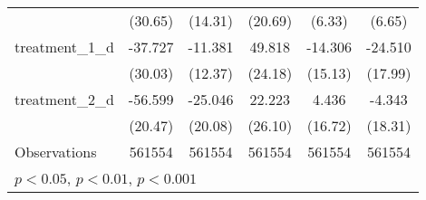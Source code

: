 {\begin{tabular}{l*{5}{c}}
                    &     (30.65)         &     (14.31)         &     (20.69)         &      (6.33)         &      (6.65)         \\
treatment\_1\_d       &     -37.727         &     -11.381         &      49.818         &     -14.306         &     -24.510         \\
                    &     (30.03)         &     (12.37)         &     (24.18)         &     (15.13)         &     (17.99)         \\
treatment\_2\_d       &     -56.599\sym{*}  &     -25.046         &      22.223         &       4.436         &      -4.343         \\
                    &     (20.47)         &     (20.08)         &     (26.10)         &     (16.72)         &     (18.31)         \\
\hline
Observations        &      561554         &      561554         &      561554         &      561554         &      561554         \\
\hline\hline
\multicolumn{6}{l}{\footnotesize \sym{*} \(p<0.05\), \sym{**} \(p<0.01\), \sym{***} \(p<0.001\)}\\
\end{tabular}
}
